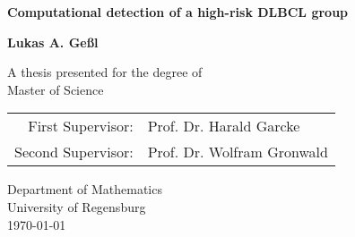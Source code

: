 \documentclass[10pt, a4paper, oneside]{report}
\begin{document}
    \begin{titlepage}
        \centering
        \vspace*{1cm}
        
        \huge
        \textsf{
        \textbf{Computational detection of a high-risk DLBCL group}
        }
        
        \vspace{1.5cm}
        
        \large
        \textbf{Lukas A. Geßl}
        
        \vfill
        
        \large
        A thesis presented for the degree of\\
        Master of Science
        
        \vspace{0.8cm}
        
        \begin{tabular}{rl}
            First Supervisor: & Prof. Dr. Harald Garcke \\
            Second Supervisor: & Prof. Dr. Wolfram Gronwald \\
        \end{tabular}
        
        \vspace{0.8cm}
        
        Department of Mathematics\\
        University of Regensburg\\
        \vspace{0.8cm}
        \today
        
    \end{titlepage}

    \tableofcontents
    
    
    
    

    
\end{document}
